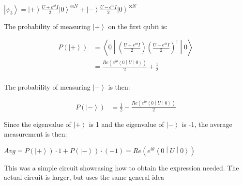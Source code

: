 \documentclass[professionalfonts]{beamer}
\newcommand{\ket}[1]{\ensuremath{\left|#1\right\rangle}}
\newcommand{\sandwich}[3]{\left< #1 \middle\vert #2 \middle\vert #3 \right>}
\newcommand{\paren}[1]{\left( #1 \right)}
\newcommand{\elec}{N}
\newcommand{\SubItem}[1]{
    {\setlength\itemindent{15pt} \item[*] #1}
}
\begin{document}
\begin{frame}
	\begin{itemize}
		\item $\ket{\psi_3}
					= \ket + \frac{U + e^{i\theta}I}{2}\ket 0^{\otimes\elec}
					+ \ket - \frac{U - e^{i\theta}I}{2}\ket 0^{\otimes\elec}$
			\SubItem{The probability of measuring $\ket +$ on the first qubit is:}
\begin{equation*}
	\begin{split}
		P(\ket +)
		&= \sandwich 0 {
			\paren{\frac{U + e^{i\theta}I}{2}}
			\paren{\frac{U + e^{i\theta}I}{2}}^\dagger
		} 0 \\
		&= \frac{Re \paren{e^{i\theta}\sandwich 0 { U } 0}}{2}
		+ \frac{1}{2} \\
	\end{split}
\end{equation*}
			\SubItem{The probability of measuring $\ket -$ is then:}
\begin{equation*}
	\begin{split}
		P(\ket -)
		&= \frac{1}{2} - \frac{Re \paren{e^{i\theta}\sandwich 0 { U } 0}}{2}
	\end{split}
\end{equation*}
	\end{itemize}
\end{frame}
\begin{frame}
	\begin{itemize}
		\item Since the eigenvalue of $\ket +$ is 1 and the eigenvalue of $\ket -$ is -1, the average measurement is then:
			\SubItem{$Avg = P(\ket +) \cdot 1 + P(\ket -) \cdot (-1) = Re\paren{e^{i\theta}\sandwich 0 {U} 0}$}

		\vspace{10pt}
		\item This was a simple circuit showcasing how to obtain the expression needed. The actual circuit is larger, but uses the same general idea
\begin{equation*}
	\begin{split}
	\end{split}
\end{equation*}
	\end{itemize}
\end{frame}
\end{document}
